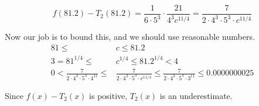 \begin{frame}[t]{}
\begin{QuestionSet}
{\[f(81.2)-T_2(81.2)=\frac{1}{6\cdot 5^3}\cdot\frac{21}{4^3c^{11/4}} = \frac{7}{2\cdot 4^3 \cdot 5^3 \cdot c^{11/4}}\]

Now our job is to bound this, and we should use reasonable numbers.
\begin{align*}
81 \leq &c \leq 81.2\\
3=81^{1/4} \leq &c^{1/4} \leq 81.2^{1/4}<4\\
0<\frac{7}{2\cdot4^3\cdot5^3\cdot 4^{11}}
        \leq &\frac{7}{2\cdot4^3\cdot5^3\cdot c^{11/4}}
         \leq\frac{7}{2\cdot4^3\cdot5^3\cdot 3^{11}}
    \le 0.0000000025
\end{align*}

Since $f(x)-T_2(x)$ is positive, $T_2(x)$ is an underestimate.
}
\end{QuestionSet}
\end{frame}



